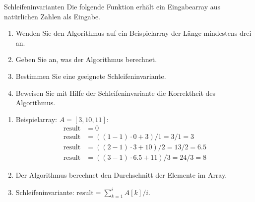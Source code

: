 \documentclass{article}
\begin{document}
\begin{exercise}{Schleifeninvarianten}
  Die folgende Funktion erhält ein Eingabearray aus natürlichen Zahlen als Eingabe.
  
  \begin{enumerate}
    \item Wenden Sie den Algorithmus auf ein Beispielarray der Länge mindestens drei an.
    \item Geben Sie an, was der Algorithmus berechnet.
    \item Bestimmen Sie eine geeignete Schleifeninvariante.
    \item Beweisen Sie mit Hilfe der Schleifeninvariante die Korrektheit des Algorithmus.
  \end{enumerate}

  \begin{solution}
    \begin{enumerate}
      \item Beispielarray: $A = [3,10,11]$:
            \begin{align*}
              \text{result} & = 0                                   \\
              \text{result} & = ((1-1) \cdot 0 + 3)/1 = 3/1 = 3     \\
              \text{result} & = ((2-1) \cdot 3 + 10)/2 = 13/2 = 6.5 \\
              \text{result} & = ((3-1) \cdot 6.5 + 11)/3 = 24/3 = 8
            \end{align*}
      \item Der Algorithmus berechnet den Durchschnitt der Elemente im Array.
      \item Schleifeninvariante: $\text{result} = \sum_{k=1}^{i} A[k]/i$.
\end{enumerate}
\end{solution}
\end{exercise}
\end{document}
